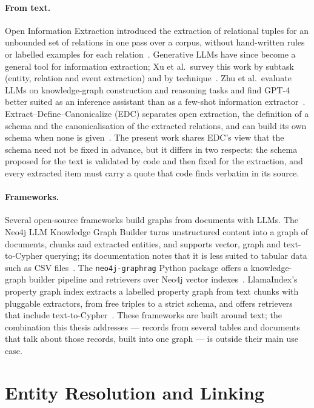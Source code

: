 \paragraph{From text.} Open Information Extraction introduced the extraction of relational tuples for an
unbounded set of relations in one pass over a corpus, without hand-written rules or labelled examples for each
relation~\cite{banko2007open}. Generative LLMs have since become a general tool for information extraction;
Xu et al.\ survey this work by subtask (entity, relation and event extraction) and by technique~\cite{xu2024large}.
Zhu et al.\ evaluate LLMs on knowledge-graph construction and reasoning tasks and find GPT-4 better suited as
an inference assistant than as a few-shot information extractor~\cite{zhu2024llms}. Extract--Define--Canonicalize
(EDC) separates open extraction, the definition of a schema and the canonicalisation of the extracted
relations, and can build its own schema when none is given~\cite{zhang2024extract}. The present work shares
EDC's view that the schema need not be fixed in advance, but it differs in two respects: the schema proposed
for the text is validated by code and then fixed for the extraction, and every extracted item must carry a
quote that code finds verbatim in its source.

\paragraph{Frameworks.} Several open-source frameworks build graphs from documents with LLMs. The Neo4j LLM
Knowledge Graph Builder turns unstructured content into a graph of documents, chunks and extracted entities,
and supports vector, graph and text-to-Cypher querying; its documentation notes that it is less suited to
tabular data such as CSV files~\cite{neo4j2026llmgraphbuilder}. The \texttt{neo4j-graphrag} Python package
offers a knowledge-graph builder pipeline and retrievers over Neo4j vector indexes~\cite{neo4j2026graphrag}.
LlamaIndex's property graph index extracts a labelled property graph from text chunks with pluggable extractors,
from free triples to a strict schema, and offers retrievers that include text-to-Cypher~\cite{llamaindex2026propertygraph}.
These frameworks are built around text; the combination this thesis addresses --- records from several tables
and documents that talk about those records, built into one graph --- is outside their main use case.

\section{Entity Resolution and Linking}\label{sec:ch02-entity-resolution-and-linking}

